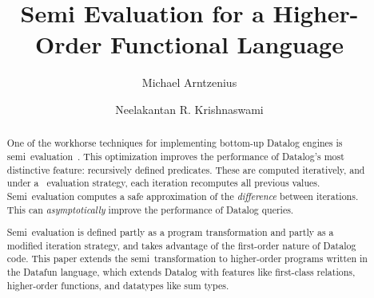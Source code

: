 \documentclass[acmsmall,review,anonymous,]{acmart}\settopmatter{printfolios=true,printccs=false,printacmref=false}
\begin{document}
\title{Semi\naive{} Evaluation for a Higher-Order Functional Language}


\author{Michael Arntzenius}

\author{Neelakantan R. Krishnaswami}


\begin{abstract}
One of the workhorse techniques for implementing bottom-up Datalog engines is
semi\naive\ evaluation~\cite{seminaive}. This optimization improves the
performance of Datalog's most distinctive feature: recursively defined
predicates. These are computed iteratively, and under a \naive\ evaluation
strategy, each iteration recomputes all previous values. Semi\naive\ evaluation
computes a safe approximation of the \emph{difference} between iterations. This
can \emph{asymptotically} improve the performance of Datalog queries.

Semi\naive\ evaluation is defined partly as a program transformation and partly
as a modified iteration strategy, and takes advantage of the first-order nature
of Datalog code.
%
This paper extends the semi\naive\ transformation to higher-order programs
written in the Datafun language, which extends Datalog with features like
first-class relations, higher-order functions, and datatypes like sum types.
\end{abstract}
\end{document}
